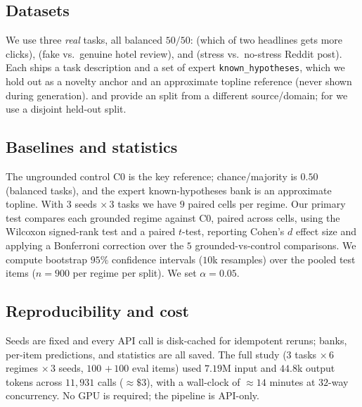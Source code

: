 \subsection{Datasets}
\label{sec:data}

We use three \hypogenic{} \emph{real} tasks, all balanced $50/50$: \headline{} (which
of two headlines gets more clicks), \deceptive{} (fake vs.\ genuine hotel review), and
\dreaddit{} (stress vs.\ no-stress Reddit post). Each ships a task description and a set
of expert \texttt{known\_hypotheses}, which we hold out as a novelty anchor and an
approximate topline reference (never shown during generation). \deceptive{} and
\dreaddit{} provide an \OOD{} split from a different source/domain; for \headline{} we
use a disjoint held-out split.

\subsection{Baselines and statistics}
\label{sec:stats}

The ungrounded control C0 is the key reference; chance/majority is $0.50$ (balanced
tasks), and the expert known-hypotheses bank is an approximate topline. With $3$ seeds
$\times\, 3$ tasks we have $9$ paired cells per regime. Our primary test compares each
grounded regime against C0, paired across cells, using the Wilcoxon signed-rank test
and a paired $t$-test, reporting Cohen's $d$ effect size and applying a Bonferroni
correction over the $5$ grounded-vs-control comparisons. We compute bootstrap $95\%$
confidence intervals ($10$k resamples) over the pooled test items ($n{=}900$ per
regime per split). We set $\alpha=0.05$.

\subsection{Reproducibility and cost}
\label{sec:repro}

Seeds are fixed and every API call is disk-cached for idempotent reruns; banks,
per-item predictions, and statistics are all saved. The full study ($3$ tasks
$\times\, 6$ regimes $\times\, 3$ seeds, $100$ \IND{} $+\, 100$ \OOD{} eval items)
used $7.19$M input and $44.8$k output tokens across $11{,}931$ calls ($\approx\$3$),
with a wall-clock of $\approx 14$ minutes at $32$-way concurrency. No GPU is required;
the pipeline is API-only.
